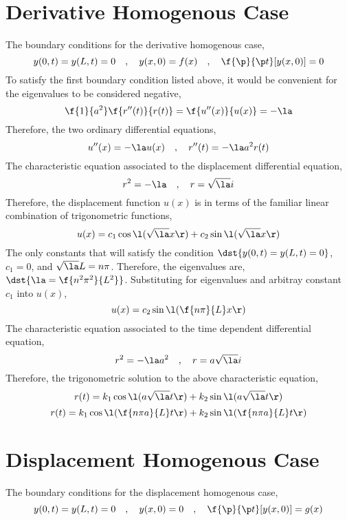 \section{Derivative Homogenous Case}
\begin{comment}
\end{comment}
The boundary conditions for the derivative homogenous case,
$$y(0,t) = y(L,t) = 0\quad,\quad y(x,0) = f(x)\quad,\quad\f{\p }{\p t}[y(x,0)] = 0$$
To satisfy the first boundary condition listed above, it would be convenient for the eigenvalues to be considered negative,
$$\f{1}{a^2}\f{r''(t)}{r(t)} = \f{u''(x)}{u(x)} = -\la$$
Therefore, the two ordinary differential equations,
$$u''(x) = -\la u(x)\quad,\quad r''(t) = -\la a^2 r(t)$$
The characteristic equation associated to the displacement differential equation,
$$r^2 = -\la\quad,\quad r = \sqrt{\la}i$$
Therefore, the displacement function $u(x)$ is in terms of the familiar linear combination of trigonometric functions,
$$u(x) = c_1\cos\l(\sqrt{\la}x\r) + c_2\sin\l(\sqrt{\la}x\r)$$
The only constants that will satisfy the condition $\dst{y(0,t) = y(L,t) = 0}$, $c_1 = 0$, and $\sqrt{\la}L = n\pi$. Therefore, the eigenvalues are, $\dst{\la = \f{n^2\pi^2}{L^2}}$. Substituting for eigenvalues and arbitray constant $c_1$ into $u(x)$,
$$u(x) = c_2\sin\l(\f{n\pi}{L}x\r)$$
The characteristic equation associated to the time dependent differential equation,
$$r^2 = -\la a^2\quad,\quad r = a\sqrt{\la}i$$
Therefore, the trigonometric solution to the above characteristic equation,
$$r(t) = k_1\cos\l(a\sqrt{\la}t\r) + k_2\sin\l(a\sqrt{\la}t\r)$$
$$r(t) = k_1\cos\l(\f{n\pi a}{L}t\r) + k_2\sin\l(\f{n\pi a}{L}t\r)$$
\section{Displacement Homogenous Case}
\begin{comment}
\end{comment}
The boundary conditions for the displacement homogenous case,
$$y(0,t) = y(L,t) = 0\quad,\quad y(x,0) = 0\quad,\quad\f{\p }{\p t}[y(x,0)] = g(x)$$
